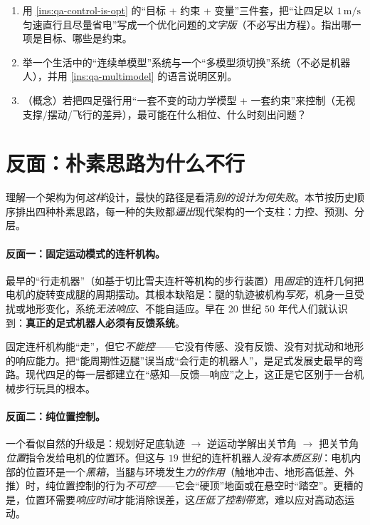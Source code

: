 \begin{practice}
\begin{enumerate}
  \item 用 \cref{ins:qa-control-is-opt} 的“目标 + 约束 + 变量”三件套，把“让四足以 $1\,\mathrm{m/s}$ 匀速直行且尽量省电”写成一个优化问题的\emph{文字版}（不必写出方程）。指出哪一项是目标、哪些是约束。
  \item 举一个生活中的“连续单模型”系统与一个“多模型须切换”系统（不必是机器人），并用 \cref{ins:qa-multimodel} 的语言说明区别。
  \item （概念）若把四足强行用“一套不变的动力学模型 + 一套约束”来控制（无视支撑/摆动/飞行的差异），最可能在什么相位、什么时刻出问题？
\end{enumerate}
\end{practice}

\section{反面：朴素思路为什么不行}
\label{sec:qa-naive}

理解一个架构为何\emph{这样}设计，最快的路径是看清\emph{别的设计为何失败}。本节按历史顺序排出四种朴素思路，每一种的失败都\emph{逼出}现代架构的一个支柱：力控、预测、分层。

\paragraph{反面一：固定运动模式的连杆机构。}
最早的“行走机器”（如基于切比雪夫连杆等机构的步行装置）用\emph{固定}的连杆几何把电机的旋转变成腿的周期摆动。其根本缺陷是：腿的轨迹被机构\emph{写死}，机身一旦受扰或地形变化，系统\emph{无法响应}、不能自适应。早在 $20$ 世纪 $50$ 年代人们就认识到：\textbf{真正的足式机器人必须有反馈系统}\cite{yu2021quadruped}。

\begin{pitfall}
固定连杆机构能“走”，但它\emph{不能控}——它没有传感、没有反馈、没有对扰动和地形的响应能力。把“能周期性迈腿”误当成“会行走的机器人”，是足式发展史最早的弯路。现代四足的每一层都建立在“感知—反馈—响应”之上，这正是它区别于一台机械步行玩具的根本。
\end{pitfall}

\paragraph{反面二：纯位置控制。}
一个看似自然的升级是：规划好足底轨迹 $\to$ 逆运动学解出关节角 $\to$ 把关节角\emph{位置}指令发给电机的位置环。但这与 $19$ 世纪的连杆机器人\emph{没有本质区别}：电机内部的位置环是一个\emph{黑箱}，当腿与环境发生\emph{力的作用}（触地冲击、地形高低差、外推）时，纯位置控制的行为\emph{不可控}——它会“硬顶”地面或在悬空时“踏空”。更糟的是，位置环需要\emph{响应时间}才能消除误差，这\emph{压低了控制带宽}，难以应对高动态运动\cite{yu2021quadruped}。

